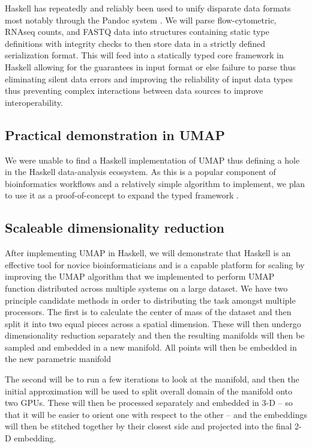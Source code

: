\documentclass[10pt,letterpaper]{article}
\begin{document}
\begin{multicols}{2}
Haskell has repeatedly and reliably been used to unify disparate data
formats most notably through the Pandoc system
\parencite{krijnen2014expand}. We will parse flow-cytometric, RNAseq
counts, and FASTQ data into structures containing static type
definitions with integrity checks to then store data in a strictly
defined serialization format. This will feed into a statically typed
core framework in Haskell allowing for the guarantees in input format
or else failure to parse thus eliminating silent data errors and
improving the reliability of input data types thus preventing complex
interactions between data sources to improve interoperability.

\subsection{Practical demonstration in UMAP}

We were unable to find a Haskell implementation of UMAP thus defining
a hole in the Haskell data-analysis ecosystem. As this is a popular
component of bioinformatics workflows and a relatively simple
algorithm to implement, we plan to use it as a proof-of-concept to
expand the typed framework .

\subsection{Scaleable dimensionality reduction}

After implementing UMAP in Haskell, we will demonstrate that Haskell
is an effective tool for novice bioinformaticians and is a capable
platform for scaling by improving the UMAP algorithm that we
implemented to perform UMAP function distributed across multiple
systems on a large dataset. We have two principle candidate methods in
order to distributing the task amongst multiple processors. The first
is to calculate the center of mass of the dataset and then split it
into two equal pieces across a spatial dimension. These will then
undergo dimensionality reduction separately and then the resulting
manifolds will then be sampled and embedded in a new manifold. All
points will then be embedded in the new parametric manifold

The second will be to run a few iterations to look at the manifold,
and then the initial approximation will be used to split overall
domain of the manifold onto two GPUs. These will then be processed
separately and embedded in 3-D -- so that it will be easier to orient
one with respect to the other -- and the embeddings will then be
stitched together by their closest side and projected into the final
2-D embedding.


\end{multicols}
\end{document}
